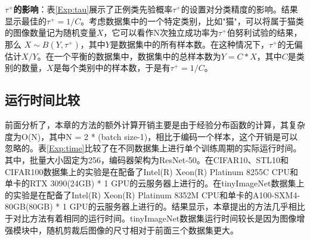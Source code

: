 \begin{table}[h!]
	\centering
	\caption{正例类先验概率$\tau^+$的影响}\label{Exp:tau}
\end{table}

\textbf{$\tau^+$的影响}：表\ref{Exp:tau}展示了正例类先验概率$\tau^+$的设置对分类精度的影响。结果显示最佳的$\tau^+ = 1/C$。考虑数据集中的一个特定类别，比如"猫"，可以将属于猫类的图像数量记为随机变量$X$，它可以看作N次独立成功率为$\tau^+$伯努利试验的结果，那么 $X\sim B(Y,\tau^+)$，其中$Y$是数据集中的所有样本数。在这种情况下，$\tau^+$的无偏估计$X/Y$。在一个平衡的数据集中，数据集中的总样本数为$Y = C * X$，其中$C$是类别的数量，$X$是每个类别中的样本数，于是有$\tau^+ = 1/C$。

\subsection{运行时间比较}
前面分析了，本章的方法的额外计算开销主要是由于经验分布函数的计算，其复杂度为O(N)，其中N = 2 * (batch size-1)，相比于编码一个样本，这个开销是可以忽略的。表\ref{Exp:time}比较了在不同数据集上进行单个训练周期的实际运行时间。其中，批量大小固定为256，编码器架构为ResNet-50。在CIFAR10、STL10和CIFAR100数据集上的实验是在配备了Intel(R) Xeon(R) Platinum 8255C CPU和单卡的RTX 3090(24GB) * 1 GPU的云服务器上进行的。在tinyImageNet数据集上的实验是在配备了Intel(R) Xeon(R) Platinum 8352M CPU和单卡的A100-SXM4-80GB(80GB) * 1 GPU的云服务器上进行的。结果显示，本章提出的方法几乎相比于对比方法有着相同的运行时间。tinyImageNet数据集运行时间较长是因为图像增强模块中，随机剪裁后图像的尺寸相对于前面三个数据集更大。
\begin{table}[h!]
	\centering
	\caption{算法运行时间比较}\label{Exp:time}
\end{table}
